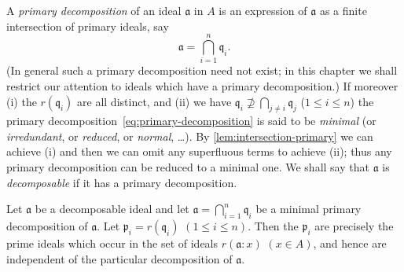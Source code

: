 A \emph{primary decomposition} of an ideal $\mathfrak{a}$ in $A$ is an expression of $\mathfrak{a}$ as a finite intersection of primary ideals, say
\begin{equation}\label{eq:primary-decomposition}
    \mathfrak{a} = \bigcap_{i=1}^n \mathfrak{q}_i. \tag{1}
\end{equation}
(In general such a primary decomposition need not exist; in this chapter we shall restrict our attention to ideals which have a primary decomposition.) If moreover (i) the $r(\mathfrak{q}_i)$ are all distinct, and (ii) we have $\mathfrak{q}_i \not\supseteq \bigcap_{j \neq i} \mathfrak{q}_j$ ($1 \leq i \leq n$) the primary decomposition~\eqref{eq:primary-decomposition} is said to be \emph{minimal} (or \emph{irredundant}, or \emph{reduced}, or \emph{normal}, \ldots). By \eqref{lem:intersection-primary} we can achieve (i) and then we can omit any superfluous terms to achieve (ii); thus any primary decomposition can be reduced to a minimal one. We shall say that $\mathfrak{a}$ is \emph{decomposable} if it has a primary decomposition.

\begin{theorem}\label{thm:first-uniqueness}
    Let $\mathfrak{a}$ be a decomposable ideal and let $\mathfrak{a} = \bigcap_{i=1}^n \mathfrak{q}_i$ be a minimal primary decomposition of $\mathfrak{a}$. Let $\mathfrak{p}_i = r(\mathfrak{q}_i)$ $(1 \leq i \leq n)$. Then the $\mathfrak{p}_i$ are precisely the prime ideals which occur in the set of ideals $r(\mathfrak{a} : x)$ $(x \in A)$, and hence are independent of the particular decomposition of $\mathfrak{a}$.
\end{theorem}

